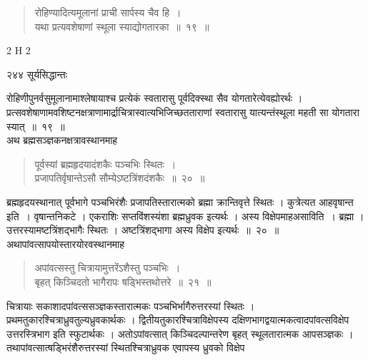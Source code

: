 \documentclass[11pt, openany]{book}
\begin{document}
 \begin{quote}
{\ssi  रोहिण्यादित्यमूलानां प्राची सार्पस्य चैव हि~।\\
यथा प्रत्यवशेषाणां स्थूला स्याद्योगतारका~॥~१९~॥}
\end{quote}
{\tiny{2 H 2}}

\newpage

\noindent २४४ \hspace{3.5cm} सूर्यसिद्धान्तः 
\vspace{2mm}


 रोहिणीपुनर्वसुमूलानामाश्लेषायाश्च प्रत्येकं स्वतारासु पूर्वदिक्स्था सैव योगतारेत्येवह्योरर्थः । प्रत्सवशेषाणामवशिष्टनक्षत्राणामार्द्राचित्रास्वात्यभिजिच्छतताराणां स्वतारासु यात्यन्तंस्थूला महती सा योगतारा स्यात्~॥~१९~॥ \\
\noindent  अथ ब्रह्मसञ्ज्ञकनक्षत्रावस्थानमाह \textendash


\begin{quote}
{\ssi पूर्वस्यां ब्रह्महृदयादंशकैः पञ्चभिः स्थितः~।\\
 प्रजापतिर्वृषान्तेऽसौ सौम्येऽष्टत्रिंशदंशकैः~॥~२०~॥ }
\end{quote}

 ब्रह्महृदयस्थानात् पूर्वभागे पञ्चभिरंशैः प्रजापतिस्तारात्मको ब्रह्मा क्रान्तिवृत्ते स्थितः । कुत्रेत्यत आह\textendash वृषान्त इति~। वृषान्तनिकटे । एकराशिः सप्तविंशस्यंशा ब्रह्मध्रुवक इत्यर्थः । अस्य विक्षेपमाह\textendash असाविति~। ब्रह्मा । उत्तरस्यामष्टत्रिंशद्भागैः स्थितः । अष्टत्रिंशद्भागा अस्य विक्षेप इत्यर्थः~॥~२०~॥\\
\noindent  अथापांवत्सापयोस्तारयोरवस्थानमाह \textendash


\begin{quote}
{\ssi अपांवत्सस्तु चित्रायामुत्तरेंऽशैस्तु पञ्चभिः~। \\
 बृहत् किञ्चिदतो भागैरापः षड्भिस्तथोत्तरे~॥~२१~॥}
\end{quote}

 चित्रायाः सकाशादपांवत्ससञ्ज्ञकस्तारात्मकः पञ्चभिर्भागैरुत्तरस्यां स्थितः । प्रथमतुकारश्चित्राध्रुवतुल्यध्रुवकार्थकः । द्वितीयतुकारश्चित्राविक्षेपस्य दक्षिणभागद्वयात्मकत्वादपांवत्सविक्षेप उत्तरस्त्रिभाग इति स्फुटार्थकः । अतोऽपांवत्सात् किञ्चिदल्पान्तरेण बृहत् स्थूलतारात्मक आपसञ्ज्ञकः । तथापांवत्सात्षड्भिरंशैरुत्तरस्यां स्थितश्चित्राध्रुवक एवापस्य ध्रुवको विक्षेप \textendash


\newpage
\end{document}

